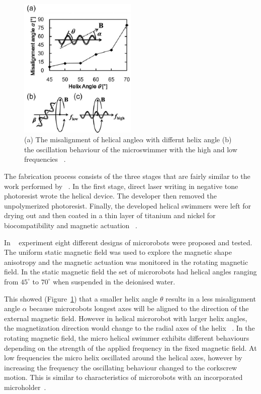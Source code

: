 \documentclass[a4paper,11pt]{article}
\begin{document}
\begin{sloppypar}
\begin{figure}
  \begin{center}
    \includegraphics[width=0.5\textwidth]{7}
  \caption{(a) The misalignment of helical angle$\alpha$ with differnt helix angle (b) the oscillation behaviour
of the microswimmer with the high and low frequencies ~\citep{tottori2012magnetic}.}
  \label{ref7}
\end{center}
\end{figure}


The fabrication process consists of the three stages that are fairly similar to the work
 performed by ~\citeauthor{kim2013fabrication}. In the first stage, direct laser writing in negative tone photoresist 
wrote the helical device. The developer then removed the unpolymerized photoresist. Finally, the 
developed helical swimmers were left for drying out and then coated in a thin layer of titanium and 
nickel for biocompatibility and magnetic actuation ~\citep{tottori2012magnetic}.

In ~\citeauthor{tottori2012magnetic} experiment eight different designs of microrobots were proposed and tested. 
The uniform static magnetic field was used to explore the magnetic shape anisotropy and the 
magnetic actuation was monitored in the rotating magnetic field. In the static magnetic field the 
set of microrobots had helical angles ranging from ${45^{\circ}}$ to ${70^{\circ}}$ when suspended in the deionised water. 

This showed (Figure~\ref{ref7}) that a smaller helix angle $\theta$ results in a less misalignment 
angle $\alpha$ because microrobots longest axes will be aligned to the direction of the external magnetic field. 
However in helical microrobot with larger helix angles, the magnetization direction would change to 
the radial axes of the helix  ~\citep{tottori2012magnetic}.
In the rotating magnetic field, the micro helical swimmer exhibits different behaviours depending on 
the strength of the applied frequency in the fixed magnetic field. At low frequencies the micro helix oscillated 
around the helical axes, however by increasing the frequency the oscillating behaviour changed to the 
corkscrew motion. This is similar to characteristics of microrobots with an incorporated
 microholder~\citep{tottori2012magnetic}. 


\end{sloppypar}
\end{document}

